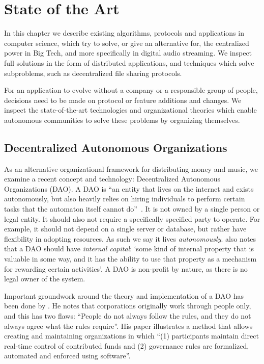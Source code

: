 \chapter{\label{chap:state-of-the-art}State of the Art}
In this chapter we describe existing algorithms, protocols and applications in computer science, which try to solve, or give an alternative for, the centralized power in Big Tech, and more specifically in digital audio streaming. We inspect full solutions in the form of distributed applications, and techniques which solve subproblems, such as decentralized file sharing protocols.

For an application to evolve without a company or a responsible group of people, decisions need to be made on protocol or feature additions and changes. We inspect the state-of-the-art technologies and organizational theories which enable autonomous communities to solve these problems by organizing themselves.

\section{Decentralized Autonomous Organizations}
As an alternative organizational framework for distributing money and music, we examine a recent concept and technology: Decentralized Autonomous Organizations (DAO).
A DAO is ``an entity that lives on the internet and exists autonomously, but also heavily relies on hiring individuals to perform certain tasks that the automaton itself cannot do''~\citep{buterin2014dao}. It is not owned by a single person or legal entity. It should also not require a specifically specified party to operate. For example, it should not depend on a single server or database, but rather have flexibility in adopting resources. As such we say it lives \textit{autonomously}. \cite{buterin2014dao} also notes that a DAO should have \textit{internal capital}: `some kind of internal property that is valuable in some way, and it has the ability to use that property as a mechanism for rewarding certain activities'. A DAO is non-profit by nature, as there is no legal owner of the system.

Important groundwork around the theory and implementation of a DAO has been done by \cite{jentzsch2016decentralized}. He notes that corporations originally work through people only, and this has two flaws: ``People do not always follow the rules, and they do not always agree what the rules require''. His paper illustrates a method that allows creating and maintaining organizations in which ``(1) participants maintain direct real-time control of contributed funds and (2) governance rules are formalized, automated and enforced using software''.

